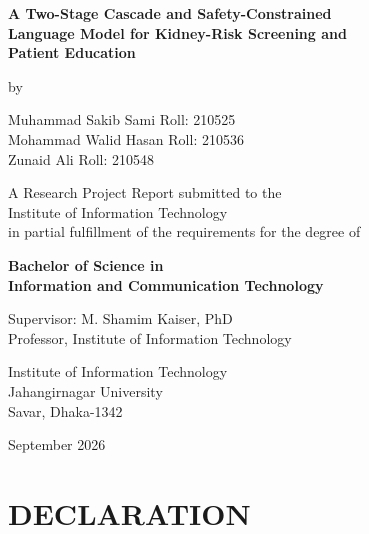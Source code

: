 \documentclass[12pt,a4paper,oneside]{report}
\begin{document}
\begin{titlepage}
\centering
\singlespacing
\vspace*{0.35in}
{\Large\bfseries A Two-Stage Cascade and Safety-Constrained\\[4pt]
Language Model for Kidney-Risk Screening and\\[4pt]
Patient Education\par}
\vspace{0.40in}
{\large by\par}
\vspace{0.18in}
{\large
Muhammad Sakib Sami \quad Roll: 210525\\[5pt]
Mohammad Walid Hasan \quad Roll: 210536\\[5pt]
Zunaid Ali \quad Roll: 210548\par}
\vspace{0.40in}
{\large A Research Project Report submitted to the\\
Institute of Information Technology\\
in partial fulfillment of the requirements for the degree of\par}
\vspace{0.18in}
{\large\bfseries Bachelor of Science in\\
Information and Communication Technology\par}
\vspace{0.35in}
{\large Supervisor: M. Shamim Kaiser, PhD\\
Professor, Institute of Information Technology\par}
\vspace{0.35in}
{\large Institute of Information Technology\\
Jahangirnagar University\\
Savar, Dhaka-1342\par}
\vspace{0.30in}
{\large September 2026\par}
\vfill
\end{titlepage}

\setcounter{page}{2}

\chapter*{DECLARATION}
\thispagestyle{fancy}
\end{document}
